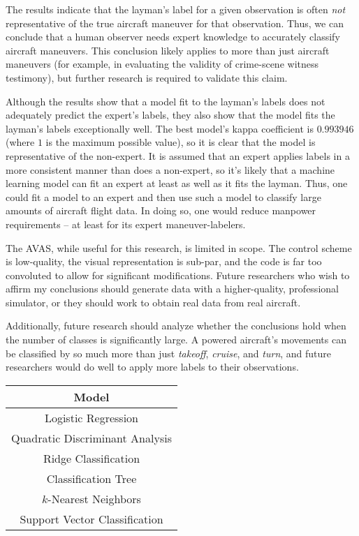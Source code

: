 \documentclass{article}
\begin{document}

The results indicate that the layman's label for a given observation is often \textit{not} representative of the true aircraft maneuver for that observation. Thus, we can conclude that a human observer needs expert knowledge to accurately classify aircraft maneuvers. This conclusion likely applies to more than just aircraft maneuvers (for example, in evaluating the validity of crime-scene witness testimony), but further research is required to validate this claim.

Although the results show that a model fit to the layman's labels does not adequately predict the expert's labels, they also show that the model fits the layman's labels exceptionally well. The best model's kappa coefficient is $0.993946$ (where $1$ is the maximum possible value), so it is clear that the model is representative of the non-expert. It is assumed that an expert applies labels in a more consistent manner than does a non-expert, so it's likely that a machine learning model can fit an expert at least as well as it fits the layman. Thus, one could fit a model to an expert and then use such a model to classify large amounts of aircraft flight data. In doing so, one would reduce manpower requirements -- at least for its expert maneuver-labelers.


The AVAS, while useful for this research, is limited in scope. The control scheme is low-quality, the visual representation is sub-par, and the code is far too convoluted to allow for significant modifications. Future researchers who wish to affirm my conclusions should generate data with a higher-quality, professional simulator, or they should work to obtain real data from real aircraft.

Additionally, future research should analyze whether the conclusions hold when the number of classes is significantly large. A powered aircraft's movements can be classified by so much more than just \textit{takeoff}, \textit{cruise}, and \textit{turn}, and future researchers would do well to apply more labels to their observations.

\begin{table}[p]
\centering
\color{DarkBlue}
\begin{tabular}{|c|}
\hline
\textbf{Model}                  \\
\hline
Logistic Regression             \\
Quadratic Discriminant Analysis \\
Ridge Classification            \\
Classification Tree             \\
$k$-Nearest Neighbors           \\
Support Vector Classification   \\
\hline
\end{tabular}
\end{table}
\end{document}
